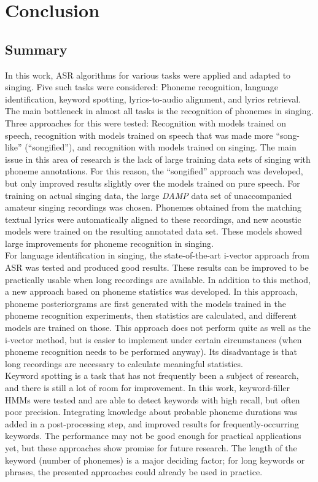 \chapter{Conclusion} \label{chap:conclusion}
\section{Summary}
In this work, ASR algorithms for various tasks were applied and adapted to singing. Five such tasks were considered: Phoneme recognition, language identification, keyword spotting, lyrics-to-audio alignment, and lyrics retrieval.\\

The main bottleneck in almost all tasks is the recognition of phonemes in singing. Three approaches for this were tested: Recognition with models trained on speech, recognition with models trained on speech that was made more ``song-like'' (``songified''), and recognition with models trained on singing. The main issue in this area of research is the lack of large training data sets of singing with phoneme annotations. For this reason, the ``songified'' approach was developed, but only improved results slightly over the models trained on pure speech. For training on actual singing data, the large \textit{DAMP} data set of unaccompanied amateur singing recordings was chosen. Phonemes obtained from the matching textual lyrics were automatically aligned to these recordings, and new acoustic models were trained on the resulting annotated data set. These models showed large improvements for phoneme recognition in singing.\\

For language identification in singing, the state-of-the-art i-vector approach from ASR was tested and produced good results. These results can be improved to be practically usable when long recordings are available. In addition to this method, a new approach based on phoneme statistics was developed. In this approach, phoneme posteriorgrams are first generated with the models trained in the phoneme recognition experiments, then statistics are calculated, and different models are trained on those. This approach does not perform quite as well as the i-vector method, but is easier to implement under certain circumstances (when phoneme recognition needs to be performed anyway). Its disadvantage is that long recordings are necessary to calculate meaningful statistics.\\

Keyword spotting is a task that has not frequently been a subject of research, and there is still a lot of room for improvement. In this work, keyword-filler HMMs were tested and are able to detect keywords with high recall, but often poor precision. Integrating knowledge about probable phoneme durations was added in a post-processing step, and improved results for frequently-occurring keywords. The performance may not be good enough for practical applications yet, but these approaches show promise for future research. The length of the keyword (number of phonemes) is a major deciding factor; for long keywords or phrases, the presented approaches could already be used in practice.\\

